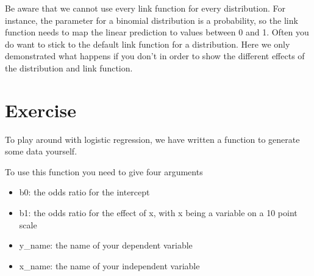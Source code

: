 \documentclass[
]{article}
\newenvironment{Shaded}{\begin{snugshade}}{\end{snugshade}}
\newcommand{\ControlFlowTok}[1]{\textcolor[rgb]{0.13,0.29,0.53}{\textbf{#1}}}
\newcommand{\DataTypeTok}[1]{\textcolor[rgb]{0.13,0.29,0.53}{#1}}
\newcommand{\DecValTok}[1]{\textcolor[rgb]{0.00,0.00,0.81}{#1}}
\newcommand{\KeywordTok}[1]{\textcolor[rgb]{0.13,0.29,0.53}{\textbf{#1}}}
\newcommand{\NormalTok}[1]{#1}
\newcommand{\OperatorTok}[1]{\textcolor[rgb]{0.81,0.36,0.00}{\textbf{#1}}}
\newcommand{\StringTok}[1]{\textcolor[rgb]{0.31,0.60,0.02}{#1}}
\providecommand{\tightlist}{%
  \setlength{\itemsep}{0pt}\setlength{\parskip}{0pt}}
\begin{document}
Be aware that we cannot use every link function for every distribution.
For instance, the parameter for a binomial distribution is a
probability, so the link function needs to map the linear prediction to
values between 0 and 1. Often you do want to stick to the default link
function for a distribution. Here we only demonstrated what happens if
you don't in order to show the different effects of the distribution and
link function.

\hypertarget{exercise}{%
\section{Exercise}\label{exercise}}

To play around with logistic regression, we have written a function to
generate some data yourself.

\begin{Shaded}
\end{Shaded}

To use this function you need to give four arguments

\begin{itemize}
\tightlist
\item
  b0: the odds ratio for the intercept
\item
  b1: the odds ratio for the effect of x, with x being a variable on a
  10 point scale
\item
  y\_name: the name of your dependent variable
\item
  x\_name: the name of your independent variable
\end{itemize}
\end{document}
